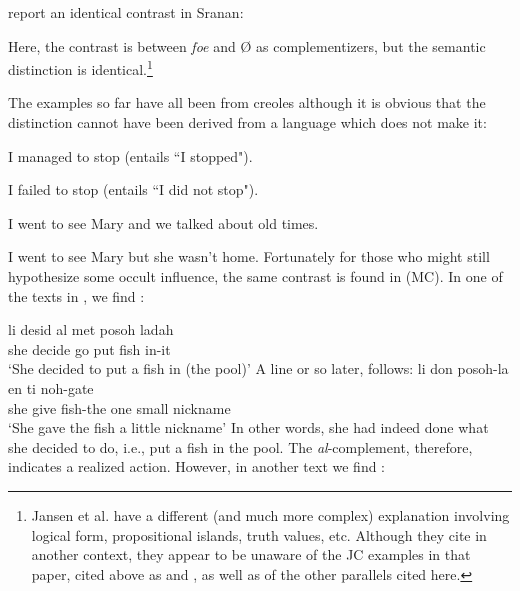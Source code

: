 \citet{JansenEtAl1978} report an identical contrast in Sranan:

\z

\label{ex:2:30}\z
Here, the contrast is between \textit{foe} and {\O} as complementizers, but the
semantic distinction is identical.\footnote{Jansen et al. have a different (and much more complex) explanation involving logical form, propositional islands, truth values, etc. Although they cite \citet{Roberts1975} in another context, they appear to be unaware of the JC examples in that paper, cited above as  and , as well as of the other parallels cited here.}

The examples so far have all been from  creoles although it is obvious that the distinction cannot have been derived from a lan\-guage which does not make it:

\ea\label{ex:2:31}
 {I} {managed} {to} {stop} {\rm (entails ``I stopped")}.
\z

\ea\label{ex:2:32}
 {I} {failed} {to} {stop} {\rm (entails ``I did not stop")}.
\z

\ea\label{ex:2:33}
I {went} {to} {see} {Mary} {and} {we} {talked} {about} {old} {times.}
\z

\ea\label{ex:2:34}
 {I} {went} {to} {see} {Mary} {but} {she} {wasn't} {home.}
\z
Fortunately for those who might still hypothesize some occult  influence, the same contrast is found in  (MC). In one of the texts in \citet{Baker1972}, we find :

\ea\label{ex:2:35}
\gll  li desid al met posoh ladah \\
she decide go put fish in-it\\
\glt `She decided to put a fish in (the pool)'
\z
A line or so later,  follows:
\ea\label{ex:2:36}
 \gll li don posoh-la en ti noh-gate\\
she give fish-the one small nickname\\
\glt `She gave the fish a little nickname'
\z
% 
In other words, she had indeed done what she decided to do, i.e., put a fish in the pool. The \textit{al}-complement, therefore, indicates a realized action. However, in another text we find :


